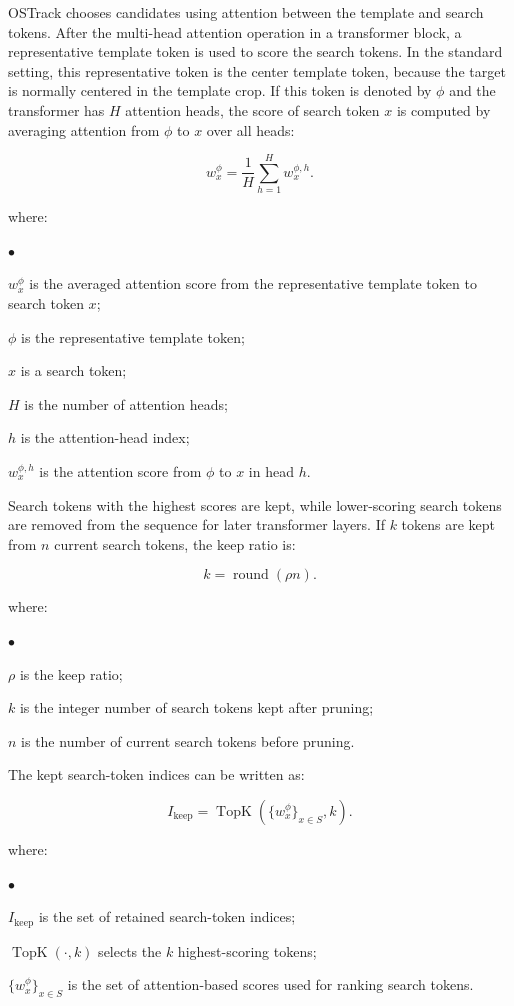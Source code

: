 \documentclass[bachelorthesis]{fer}
\numberwithin{equation}{chapter}
\newcommand{\FormulaNotationWith}[2]{%
    \vspace{-0.6em}
    \noindent\hspace*{1.2em}%
    \begin{minipage}{0.90\textwidth}
        \footnotesize
        #1
        \vspace{0.2em}
        \begin{list}{\(\bullet\)}{
            \setlength{\leftmargin}{1.4em}
            \setlength{\labelwidth}{0.8em}
            \setlength{\labelsep}{0.5em}
            \setlength{\itemsep}{0.05em}
            \setlength{\parsep}{0pt}
            \setlength{\topsep}{0.25em}
            \setlength{\partopsep}{0pt}
        }
            #2
        \end{list}
    \end{minipage}
    \par
    \vspace{0.8em}

}
\newcommand{\FormulaNotation}[1]{\FormulaNotationWith{where:}{#1}}
\begin{document}
    OSTrack chooses candidates using attention between the template and search tokens. After the multi-head attention
    operation in a transformer block, a representative template token is used to score the search tokens. In the standard
    setting, this representative token is the center template token, because the target is normally centered in the template
    crop. If this token is denoted by \(\phi\) and the transformer has \(H\) attention heads, the score of search token
    \(x\) is computed by averaging attention from \(\phi\) to \(x\) over all heads:

    \begin{equation}
        w_x^{\phi} = \frac{1}{H}\sum_{h=1}^{H} w_x^{\phi,h}.
    \end{equation}
    \FormulaNotation{
        \item \(w_x^{\phi}\) is the averaged attention score from the representative template token to search token \(x\);
        \item \(\phi\) is the representative template token;
        \item \(x\) is a search token;
        \item \(H\) is the number of attention heads;
        \item \(h\) is the attention-head index;
        \item \(w_x^{\phi,h}\) is the attention score from \(\phi\) to \(x\) in head \(h\).
    }

    Search tokens with the highest scores are kept, while lower-scoring search tokens are
    removed from the sequence for later transformer layers. If \(k\) tokens are kept from
    \(n\) current search tokens, the keep ratio is:

    \begin{equation}
        k = \operatorname{round}(\rho n).
    \end{equation}
    \FormulaNotation{
        \item \(\rho\) is the keep ratio;
        \item \(k\) is the integer number of search tokens kept after pruning;
        \item \(n\) is the number of current search tokens before pruning.
    }

    The kept search-token indices can be written as:

    \begin{equation}
        I_{\text{keep}} = \operatorname{TopK}\left(\{w_x^{\phi}\}_{x \in S}, k\right).
    \end{equation}
    \FormulaNotation{
        \item \(I_{\text{keep}}\) is the set of retained search-token indices;
        \item \(\operatorname{TopK}(\cdot,k)\) selects the \(k\) highest-scoring tokens;
        \item \(\{w_x^{\phi}\}_{x \in S}\) is the set of attention-based scores used for ranking search tokens.
    }
\end{document}
